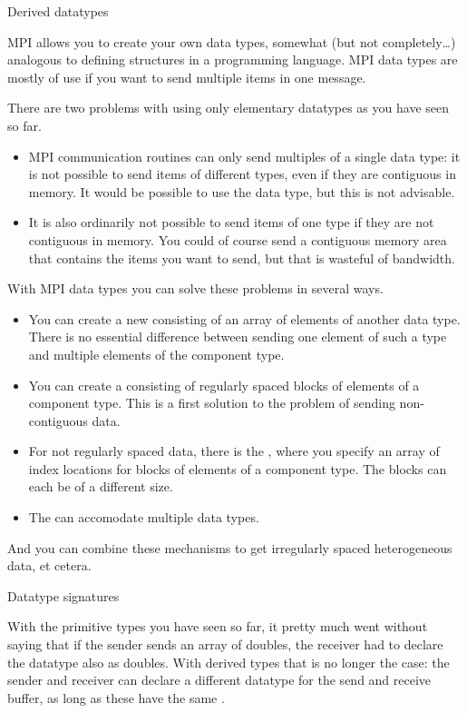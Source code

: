 
 {Derived datatypes}

MPI allows you to create your own data types, somewhat (but not completely\ldots)
analogous to defining
structures in a programming language. MPI data types are mostly of use
if you want to send multiple items in one message.

There are two problems with using only elementary datatypes
as you have seen so far.
\begin{itemize}
\item MPI communication routines can only send multiples of a
  single data type: it is not possible to send items of different
  types, even if they are contiguous in memory. It would be possible
  to use the  data type, but this is not advisable.
\item It is also ordinarily not possible to send items of one type if they are
  not contiguous in memory. You could of course send a contiguous memory area
  that contains the items you want to send, but that is wasteful of
  bandwidth.
\end{itemize}
With MPI data types you can solve these problems in several ways.
\begin{itemize}
\item You can create a new 
  consisting of an array of elements of another data type. There is no
  essential difference between sending one element of such a type
  and multiple elements of the
  component type.
\item You can create a  consisting of
  regularly spaced blocks of elements of a component type. This is a first
  solution to the problem of sending non-contiguous data.
\item For not regularly spaced data, there is the
  , where you specify an array of
  index locations for blocks of elements of a component type.
  The blocks can each be of a different size.
\item The  can accomodate multiple
  data types.
\end{itemize}
And you can combine these mechanisms to get irregularly spaced
heterogeneous data, et cetera.

 {Datatype signatures}
\label{sec:signature}

With the primitive types you have seen so far, it pretty much went
without saying that if the sender sends an array of doubles, the
receiver had to declare the datatype also as doubles. With derived
types that is no longer the case: the sender and receiver can declare
a different datatype for the send and receive buffer, as long as these
have the same .

